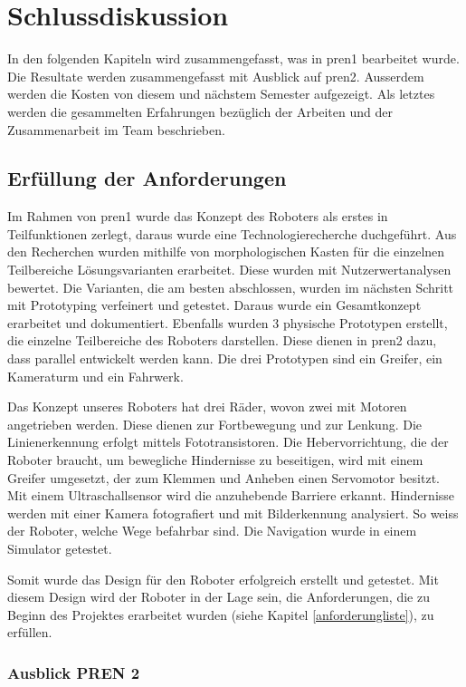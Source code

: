 \section{Schlussdiskussion}

In den folgenden Kapiteln wird zusammengefasst, was in \acrshort{pren1} bearbeitet wurde.
Die Resultate werden zusammengefasst mit Ausblick auf \acrshort{pren2}.
Ausserdem werden die Kosten von diesem und nächstem Semester aufgezeigt.
Als letztes werden die gesammelten Erfahrungen bezüglich der Arbeiten und der Zusammenarbeit im Team beschrieben.

\subsection{Erfüllung der Anforderungen}

Im Rahmen von \acrshort{pren1} wurde das Konzept des Roboters als erstes in Teilfunktionen zerlegt, daraus wurde eine Technologierecherche duchgeführt. Aus den Recherchen wurden mithilfe von morphologischen Kasten für die einzelnen Teilbereiche Lösungsvarianten erarbeitet. Diese wurden mit Nutzerwertanalysen bewertet. Die Varianten, die am besten abschlossen, wurden im nächsten Schritt mit Prototyping verfeinert und getestet. Daraus wurde ein Gesamtkonzept erarbeitet und dokumentiert. Ebenfalls wurden 3 physische Prototypen erstellt, die einzelne Teilbereiche des Roboters darstellen. Diese dienen in \acrshort{pren2} dazu, dass parallel entwickelt werden kann. Die drei Prototypen sind ein Greifer, ein Kameraturm und ein Fahrwerk.

Das Konzept unseres Roboters hat drei Räder, wovon zwei mit Motoren angetrieben werden. Diese dienen zur Fortbewegung und zur Lenkung. Die Linienerkennung erfolgt mittels Fototransistoren. Die Hebervorrichtung, die der Roboter braucht, um bewegliche Hindernisse zu beseitigen, wird mit einem Greifer umgesetzt, der zum Klemmen und Anheben einen Servomotor besitzt. Mit einem Ultraschallsensor wird die anzuhebende Barriere erkannt. 
Hindernisse werden mit einer Kamera fotografiert und mit Bilderkennung analysiert. So weiss der Roboter, welche Wege befahrbar sind. Die Navigation wurde in einem Simulator getestet.

Somit wurde das Design für den Roboter erfolgreich erstellt und getestet. Mit diesem Design wird der Roboter in der Lage sein, die Anforderungen, die zu Beginn des Projektes erarbeitet wurden (siehe Kapitel \ref{anforderungliste}), zu erfüllen.

\subsubsection{Ausblick PREN 2}

